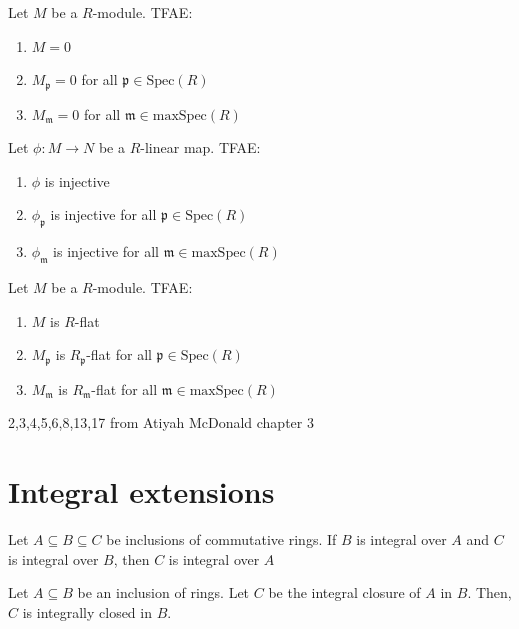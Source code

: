 \documentclass[oneside, 12pt]{scrbook}
\newcommand{\spec}{\mathrm{Spec}}
\newcommand{\pr}{\mathfrak{p}}
\newcommand{\m}{\mathfrak{m}}
\theoremstyle{theorem}
\begin{document}
\begin{proposition}
Let $M$ be a $R$-module. TFAE: 
\begin{enumerate}
\item $M=0$
\item $M_{\pr} = 0$ for all $\pr \in \spec(R)$
\item $M_{\m}=0$ for all $\m \in \mathrm{maxSpec}(R)$
\end{enumerate}
\end{proposition}

\begin{proposition}
Let $\phi: M \rightarrow N$ be a $R$-linear map. TFAE: 
\begin{enumerate}
\item $\phi$ is injective
\item $\phi_{\pr}$ is injective for all $\pr \in \spec(R)$
\item $\phi_{\m}$ is injective for all $\m \in \mathrm{maxSpec}(R)$
\end{enumerate}
\end{proposition}

\begin{proposition}
Let $M$ be a $R$-module. TFAE: 
\begin{enumerate}
\item $M$ is $R$-flat
\item $M_{\pr}$ is $R_{\pr}$-flat for all $\pr \in \spec(R)$
\item $M_{\m}$ is $R_{\m}$-flat for all $\m \in \mathrm{maxSpec}(R)$
\end{enumerate}
\end{proposition}

\begin{exercise}
2,3,4,5,6,8,13,17 from Atiyah McDonald chapter 3
\end{exercise}

\chapter{Integral extensions}

\begin{proposition}
Let $A\subseteq B \subseteq C$ be inclusions of commutative rings. If $B$ is integral over $A$ and $C$ is integral over $B$, then $C$ is integral over $A$
\end{proposition}

\begin{corollary}
Let $A \subseteq B$ be an inclusion of rings. Let $C$ be the integral closure of $A$ in $B$. Then, $C$ is integrally closed in $B$.
\end{corollary}
\end{document}
